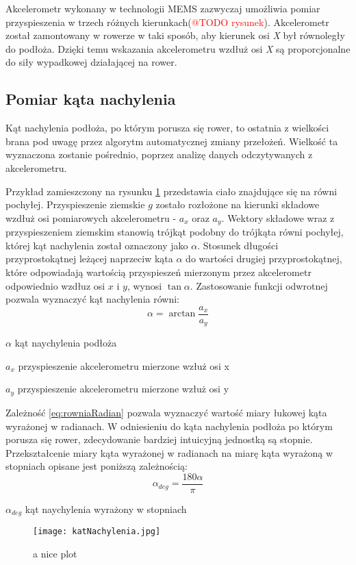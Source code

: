 Akcelerometr wykonany w technologii MEMS zazwyczaj umożliwia pomiar przyspieszenia w trzech różnych kierunkach(\textcolor{red}{@TODO rysunek}). Akcelerometr został zamontowany w rowerze w taki sposób, aby kierunek osi \textit{X} był równoległy do podłoża. Dzięki temu wskazania akcelerometru wzdłuż osi \textit{X} są proporcjonalne do siły wypadkowej działającej na rower.

\subsection{Pomiar kąta nachylenia}
Kąt nachylenia podłoża, po którym porusza się rower, to ostatnia z wielkości  brana pod uwagę przez algorytm automatycznej zmiany przełożeń. Wielkość ta wyznaczona zostanie pośrednio, poprzez analizę danych odczytywanych z akcelerometru. 

Przykład zamieszczony na rysunku \ref{fig:równia} przedstawia ciało znajdujące się na równi pochyłej. Przyspieszenie ziemskie \textit{$g$} zostało rozłożone na kierunki składowe wzdłuż osi pomiarowych akcelerometru - \textit{$a_x$} oraz \textit{$a_y$}. Wektory składowe wraz z przyspieszeniem ziemskim stanowią trójkąt podobny do trójkąta równi pochyłej, której kąt nachylenia został oznaczony jako $\alpha$. Stosunek długości przyprostokątnej leżącej naprzeciw kąta $\alpha$ do wartości drugiej przyprostokątnej, które odpowiadają wartością przyspieszeń mierzonym przez akcelerometr odpowiednio wzdłuz osi $x$ i $y$, wynosi $\tan{\alpha}$. Zastosowanie funkcji odwrotnej pozwala wyznaczyć kąt nachylenia równi:
\begin{equation}
    \alpha=\arctan{\frac{a_x}{a_y}}
    \label{eq:rowniaRadian}
\end{equation}
\begin{eqwhere}[2cm]
	\item[$\alpha$] kąt naychylenia podłoża
	\item[$a_x$] przyspieszenie akcelerometru mierzone wzłuż osi x
	\item[$a_y$] przyspieszenie akcelerometru mierzone wzłuż osi y
\end{eqwhere}
Zależność \ref{eq:rowniaRadian} pozwala wyznaczyć wartość miary łukowej kąta wyrażonej w radianach. W odniesieniu do kąta nachylenia podłoża po którym porusza się rower, zdecydowanie bardziej intuicyjną jednostką są stopnie. Przekształcenie miary kąta wyrażonej w radianach na miarę kąta wyrażoną w stopniach opisane jest poniższą zależnością:
\begin{equation}
    \alpha_{deg}=\frac{180\alpha}{\pi}
    \label{eq:rowniaStopnie}
\end{equation}
\begin{eqwhere}[2cm]
	\item[$\alpha_{deg}$] kąt naychylenia wyrażony w stopniach
\end{eqwhere}
\begin{figure}
    \centering
    \texttt{[image: katNachylenia.jpg]}
    \caption{a nice plot}
    \label{fig:równia}
\end{figure}

